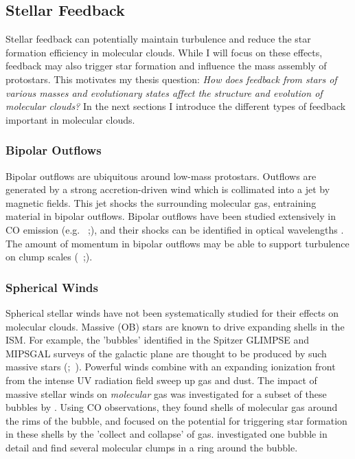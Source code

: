 \subsection{Stellar Feedback}\label{sec:feedback}
Stellar feedback can potentially maintain turbulence and reduce the star formation efficiency in molecular clouds. While I will focus on these effects, feedback may also trigger star formation and influence the mass assembly of protostars. This motivates my thesis question: \textit{How does feedback from stars of various masses and evolutionary states affect the structure and evolution of molecular clouds?} In the next sections I introduce the different types of feedback important in molecular clouds.

\subsubsection{Bipolar Outflows}\label{sec:outflow}
Bipolar outflows are ubiquitous around low-mass protostars. Outflows are generated by a strong accretion-driven wind which is collimated into a jet by magnetic fields. This jet shocks the surrounding molecular gas, entraining material in bipolar outflows. Bipolar outflows have been studied extensively in CO emission (e.g. \citet{Plunkett_2013}~;\cite{Plunkett_2015}), and their shocks can be identified in optical wavelengths \cite{Reipurth_2001}. The amount of momentum in bipolar outflows may be able to support turbulence on clump scales (\citet{Frank14}~;\citet{Offner_2014}).

\subsubsection{Spherical Winds}\label{sec:wind}
Spherical stellar winds have not been systematically studied for their effects on molecular clouds. Massive (OB) stars are known to drive expanding shells in the ISM. For example, the 'bubbles' identified in the Spitzer GLIMPSE and MIPSGAL surveys of the galactic plane are thought to be produced by such massive stars (\citet{Churchwell_2006};~\citet{Beaumont14}). Powerful winds combine with an expanding ionization front from the intense UV radiation field sweep up gas and dust. The impact of massive stellar winds on \textit{molecular} gas was investigated for a subset of these bubbles by \cite{Beaumont_2010}. Using CO observations, they found shells of molecular gas around the rims of the bubble, and focused on the potential for triggering star formation in these shells by the 'collect and collapse' of gas. \cite{Sidorin14} investigated one bubble in detail and find several molecular clumps in a ring around the bubble.

